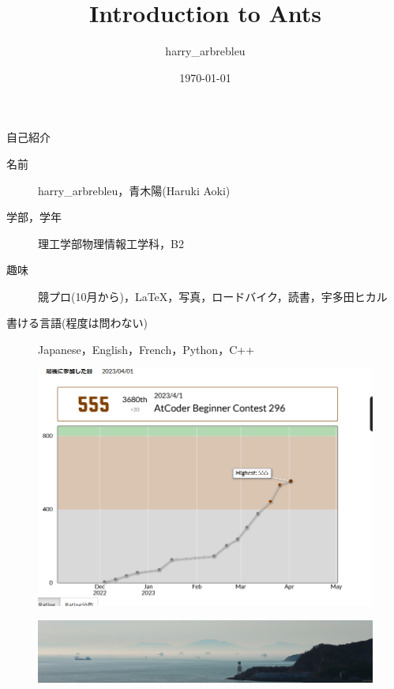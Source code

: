 \documentclass[12pt, unicode]{beamer}
\title{Introduction to Ants}
\author{\textcolor[HTML]{804000}{harry\_arbrebleu}}
\date{\today}
\institute[慶應理工]{慶應義塾大学理工学部}
\begin{document}
  \frame{\maketitle}
  \begin{frame}{自己紹介}
    \begin{description}
      \item[名前] \textcolor[HTML]{804000}{harry\_arbrebleu}，青木陽(Haruki Aoki) \pause
      \item[学部，学年] 理工学部物理情報工学科，B2
      \item[趣味] 競プロ(10月から)，\LaTeX，写真，ロードバイク，読書，宇多田ヒカル
      \item[書ける言語(程度は問わない)] Japanese，English，French，Python，C++
    \end{description}
  \end{frame}
  \begin{frame}
    \begin{figure}
      \centering
      \includegraphics[scale = 0.5]{progression.png}
    \end{figure}
  \end{frame}
  \begin{frame}
    \begin{figure}
      \centering
      \includegraphics[scale = 1]{my_photo.JPG}
    \end{figure}
  \end{frame}
\end{document}
